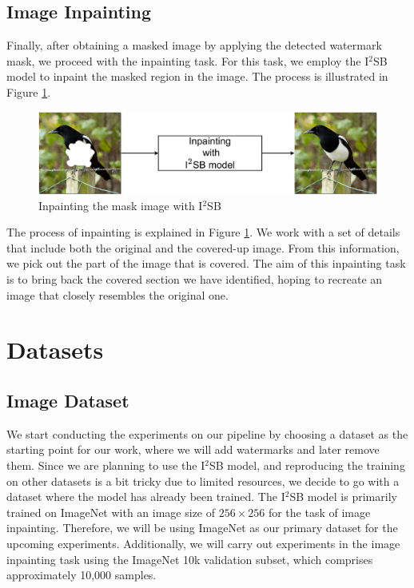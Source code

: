 \subsection{Image Inpainting}
Finally, after obtaining a masked image by applying the detected watermark mask, we proceed with the inpainting task. For this task, we employ the I$^2$SB model to inpaint the masked region in the image. The process is illustrated in Figure \ref{figure:inpainting_arch}.
\begin{figure}[t]
 \centering
 \includegraphics[width=0.75\linewidth]{img/inpainting_arch.png}

 \caption{Inpainting the mask image with I$^2$SB}
 \label{figure:inpainting_arch}
\end{figure}
The process of inpainting is explained in Figure \ref{figure:inpainting_arch}. We work with a set of details that include both the original and the covered-up image. From this information, we pick out the part of the image that is covered. The aim of this inpainting task is to bring back the covered section we have identified, hoping to recreate an image that closely resembles the original one.

\section{Datasets}
\label{sec:dataset}
\subsection{Image Dataset}
\label{sec:dataset:clean}

We start conducting the experiments on our pipeline by choosing a dataset as the starting point for our work, where we will add watermarks and later remove them. Since we are planning to use the I$^2$SB model, and reproducing the training on other datasets is a bit tricky due to limited resources, we decide to go with a dataset where the model has already been trained. The I$^2$SB model is primarily trained on ImageNet with an image size of $256 \times 256$ for the task of image inpainting. Therefore, we will be using ImageNet as our primary dataset for the upcoming experiments. Additionally, we will carry out experiments in the image inpainting task using the ImageNet 10k validation subset, which comprises approximately 10,000 samples.

